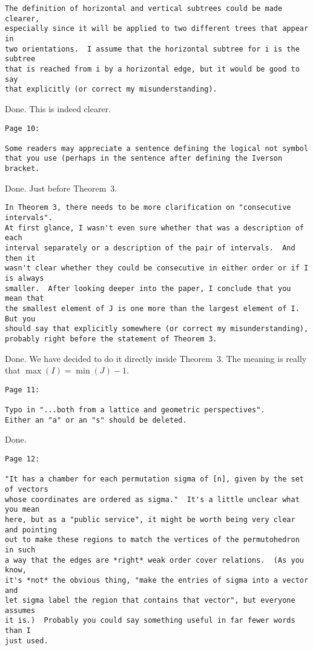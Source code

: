 \documentclass{article}
\begin{document}
\begin{verbatim}
The definition of horizontal and vertical subtrees could be made clearer, 
especially since it will be applied to two different trees that appear in 
two orientations.  I assume that the horizontal subtree for i is the subtree 
that is reached from i by a horizontal edge, but it would be good to say 
that explicitly (or correct my misunderstanding).
\end{verbatim}

Done. This is indeed clearer.

\begin{verbatim}
Page 10:

Some readers may appreciate a sentence defining the logical not symbol 
that you use (perhaps in the sentence after defining the Iverson bracket.
\end{verbatim}

Done. Just before Theorem~3.

\begin{verbatim}
In Theorem 3, there needs to be more clarification on "consecutive intervals".  
At first glance, I wasn't even sure whether that was a description of each 
interval separately or a description of the pair of intervals.  And then it 
wasn't clear whether they could be consecutive in either order or if I is always 
smaller.  After looking deeper into the paper, I conclude that you mean that 
the smallest element of J is one more than the largest element of I.  But you 
should say that explicitly somewhere (or correct my misunderstanding), 
probably right before the statement of Theorem 3.
\end{verbatim}

Done. We have decided to do it directly inside Theorem~3. The meaning is really that $\max(I) = \min(J)-1$.

\begin{verbatim}
Page 11:

Typo in "...both from a lattice and geometric perspectives".  
Either an "a" or an "s" should be deleted.
\end{verbatim}

Done.

\begin{verbatim}
Page 12:

"It has a chamber for each permutation sigma of [n], given by the set of vectors 
whose coordinates are ordered as sigma."  It's a little unclear what you mean 
here, but as a "public service", it might be worth being very clear and pointing 
out to make these regions to match the vertices of the permutohedron in such 
a way that the edges are *right* weak order cover relations.  (As you know, 
it's *not* the obvious thing, "make the entries of sigma into a vector and 
let sigma label the region that contains that vector", but everyone assumes 
it is.)  Probably you could say something useful in far fewer words than I 
just used.
\end{verbatim}
\end{document}
